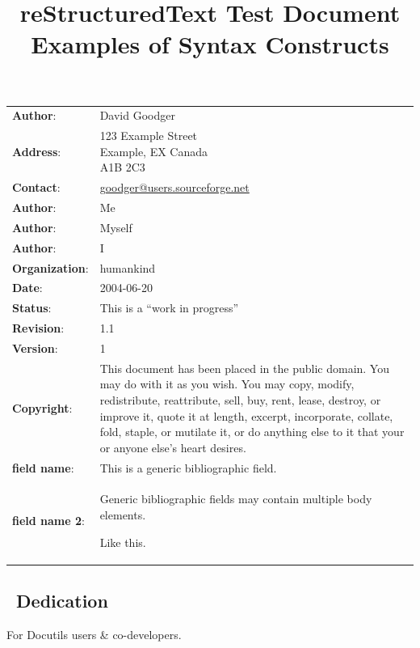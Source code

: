 \documentclass[10pt,english]{article}
\title{reStructuredText Test Document\\
\large{Examples of Syntax Constructs}
}
\author{}
\date{}
\newlength{\docinfowidth}
\newlength{\locallinewidth}
\begin{document}
\maketitle

\begin{center}
\begin{tabularx}{\docinfowidth}{lX}
\textbf{Author}: &
	David Goodger \\
\textbf{Address}: &
	{\raggedright
123 Example Street~\\
Example, EX  Canada~\\
A1B 2C3 } \\
\textbf{Contact}: &
	\href{mailto:goodger@users.sourceforge.net}{goodger@users.sourceforge.net} \\
\textbf{Author}: &
	Me \\
\textbf{Author}: &
	Myself \\
\textbf{Author}: &
	I \\
\textbf{Organization}: &
	humankind \\
\textbf{Date}: &
	2004-06-20 \\
\textbf{Status}: &
	This is a ``work in progress'' \\
\textbf{Revision}: &
	1.1 \\
\textbf{Version}: &
	1 \\
\textbf{Copyright}: &
	This document has been placed in the public domain. You
may do with it as you wish. You may copy, modify,
redistribute, reattribute, sell, buy, rent, lease,
destroy, or improve it, quote it at length, excerpt,
incorporate, collate, fold, staple, or mutilate it, or do
anything else to it that your or anyone else's heart
desires. \\
\textbf{field name}: &
	This is a generic bibliographic field. \\
\textbf{field name 2}: &
	Generic bibliographic fields may contain multiple body elements.

Like this. \\
\end{tabularx}
\end{center}

\setlength{\locallinewidth}{\linewidth}


\subsection*{~\hfill Dedication\hfill ~}

For Docutils users {\&} co-developers.
\end{document}
